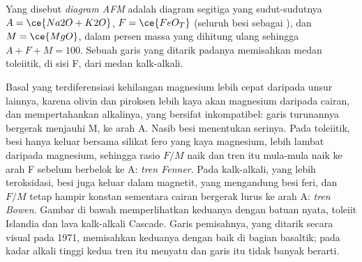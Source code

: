 \begin{definition}\label{def:b2:magmatic-series:afm}
Yang disebut \emph{diagram AFM} adalah diagram segitiga yang sudut-sudutnya
$A = \ce{Na2O + K2O}$, $F = \ce{FeO_T}$ (seluruh besi sebagai ), dan $M = \ce{MgO}$, dalam
persen massa yang dihitung ulang sehingga $A + F + M = 100$. Sebuah garis yang ditarik padanya memisahkan
medan toleiitik, di sisi F, dari medan kalk-alkali.
\end{definition}

Basal yang terdiferensiasi kehilangan magnesium lebih cepat daripada unsur lainnya, karena olivin dan
piroksen lebih kaya akan magnesium daripada cairan, dan mempertahankan alkalinya, yang bersifat
inkompatibel: garis turunannya bergerak menjauhi M, ke arah A. Nasib
besi menentukan serinya. Pada  toleiitik, besi hanya keluar bersama silikat
fero yang kaya magnesium, lebih lambat daripada magnesium, sehingga rasio
$F/M$ naik dan tren itu mula-mula naik ke arah F sebelum berbelok ke A:
\emph{tren Fenner}. Pada  kalk-alkali, yang lebih teroksidasi, besi juga keluar dalam
magnetit, yang mengandung besi feri, dan $F/M$ tetap hampir konstan sementara cairan
bergerak lurus ke arah A: \emph{tren Bowen}. Gambar di bawah memperlihatkan keduanya dengan
batuan nyata, toleiit Islandia dan lava kalk-alkali Cascade. Garis
pemisahnya, yang ditarik secara visual pada 1971, memisahkan keduanya dengan baik di bagian basaltik; pada
kadar alkali tinggi kedua tren itu menyatu dan garis itu tidak banyak berarti.

